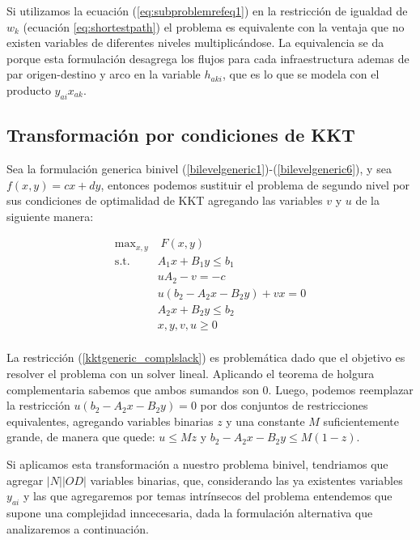 \documentclass{article}
\begin{document}
  Si utilizamos la ecuación (\ref{eq:subproblemrefeq1}) en la restricción de igualdad de $w_k$ (ecuación \ref{eq:shortestpath}) el problema es equivalente con la ventaja que no existen variables de diferentes niveles multiplicándose. La equivalencia se da porque esta formulación desagrega los flujos para cada infraestructura ademas de par origen-destino y arco en la variable $h_{aki}$, que es lo que se modela con el producto $y_{ai} x_{ak}$.

  \subsection{Transformación por condiciones de KKT}

  Sea la formulación generica binivel (\ref{bilevelgeneric1})-(\ref{bilevelgeneric6}), y sea $f(x, y) = cx + dy$, entonces podemos sustituir el problema de segundo nivel por sus condiciones de optimalidad de KKT agregando las variables $v$ y $u$ de la siguiente manera:

  \begin{align}
    \text{max}_{x,y}        & \; F(x, y) \label{kktgeneric1} \\
    \text{s.t.}             & A_1 x + B_1 y \leq b_1 \\
                            & uA_2 - v = -c \\
                            & u(b_2 - A_2x - B_2y) + vx = 0 \label{kktgeneric_complslack} \\
                            & A_2 x + B_2 y \leq b_2 \label{kktgeneric5} \\
                            & x, y, v, u \geq 0 \label{kktgeneric6} \\
  \end{align}

  La restricción (\ref{kktgeneric_complslack}) es problemática dado que el objetivo es resolver el problema con un solver lineal. Aplicando el teorema de holgura complementaria sabemos que ambos sumandos son 0. Luego, podemos reemplazar la restricción $u(b_2 - A_2x - B_2y) = 0$ por dos conjuntos de restricciones equivalentes, agregando variables binarias $z$ y una constante $M$ suficientemente grande, de manera que quede: $u \leq Mz$ y $b_2 - A_2x - B_2y \leq M(1-z)$.

  Si aplicamos esta transformación a nuestro problema binivel, tendriamos que agregar $|N| |OD|$ variables binarias, que, considerando las ya existentes variables $y_{ai}$ y las que agregaremos por temas intrínsecos del problema entendemos que supone una complejidad inncecesaria, dada la formulación alternativa que analizaremos a continuación.
\end{document}
